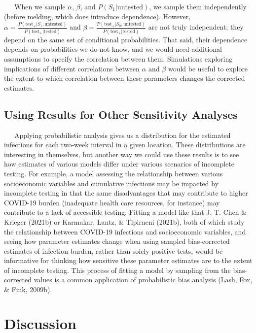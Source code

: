 \documentclass[12pt,twoside]{smiththesis}
\begin{document}
~~~When we sample \(\alpha\), \(\beta\), and \(P(S_1|\text{untested})\), we sample them independently (before melding, which does introduce dependence). However, \(\alpha=\frac{P(\text{test}_+|S_1, \text{untested})}{P(\text{test}_+| \text{tested})}\) and \(\beta=\frac{P(\text{test}_+|S_0, \text{untested})}{P(\text{test}_+| \text{tested})}\) are not truly independent; they depend on the same set of conditional probabilities. That said, their dependence depends on probabilities we do not know, and we would need additional assumptions to specify the correlation between them. Simulations exploring implications of different correlations between \(\alpha\) and \(\beta\) would be useful to explore the extent to which correlation between these parameters changes the corrected estimates.

\hypertarget{using-results-for-other-sensitivity-analyses}{%
\subsection{Using Results for Other Sensitivity Analyses}\label{using-results-for-other-sensitivity-analyses}}

~~~Applying probabilistic analysis gives us a distribution for the estimated infections for each two-week interval in a given location. These distributions are interesting in themselves, but another way we could use these results is to see how estimates of various models differ under various scenarios of incomplete testing. For example, a model assessing the relationship between various socioeconomic variables and cumulative infections may be impacted by incomplete testing in that the same disadvantages that may contribute to higher COVID-19 burden (inadequate health care resources, for instance) may contribute to a lack of accessible testing. Fitting a model like that J. T. Chen \& Krieger (2021b) or Karmakar, Lantz, \& Tipirneni (2021b), both of which study the relationship between COVID-19 infections and socioeconomic variables, and seeing how parameter estimates change when using sampled bias-corrected estimates of infection burden, rather than solely positive tests, would be informative for thinking how sensitive these parameter estimates are to the extent of incomplete testing. This process of fitting a model by sampling from the bias-corrected values is a common application of probabilistic bias analysis (Lash, Fox, \& Fink, 2009b).

\hypertarget{discussion}{%
\section{Discussion}\label{discussion}}
\end{document}
